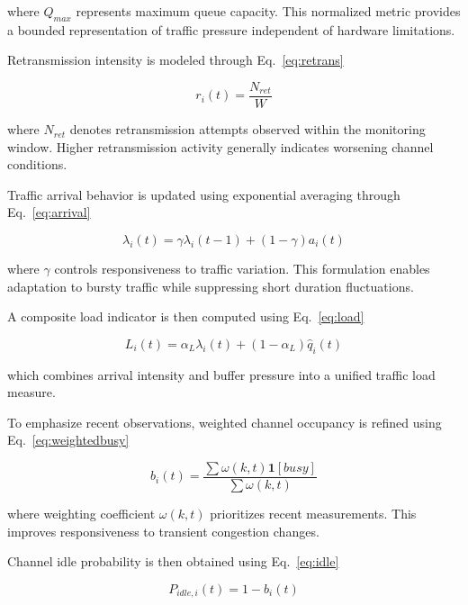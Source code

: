 \documentclass[a4paper,fleqn,final,1p]{cas-dc}
\numberwithin{equation}{section}
\begin{document}
where $Q_{max}$ represents maximum queue capacity. This normalized metric provides a bounded representation of traffic pressure independent of hardware limitations.

Retransmission intensity is modeled through Eq.~\ref{eq:retrans}

\begin{equation}
r_i(t)=
\frac{
N_{ret}
}{W}
\label{eq:retrans}
\end{equation}

where $N_{ret}$ denotes retransmission attempts observed within the monitoring window. Higher retransmission activity generally indicates worsening channel conditions.

Traffic arrival behavior is updated using exponential averaging through Eq.~\ref{eq:arrival}

\begin{equation}
\lambda_i(t)=
\gamma \lambda_i(t-1)
+
(1-\gamma)a_i(t)
\label{eq:arrival}
\end{equation}

where $\gamma$ controls responsiveness to traffic variation. This formulation enables adaptation to bursty traffic while suppressing short duration fluctuations.

A composite load indicator is then computed using Eq.~\ref{eq:load}

\begin{equation}
L_i(t)=
\alpha_L\lambda_i(t)
+
(1-\alpha_L)\hat q_i(t)
\label{eq:load}
\end{equation}

which combines arrival intensity and buffer pressure into a unified traffic load measure.

To emphasize recent observations, weighted channel occupancy is refined using Eq.~\ref{eq:weightedbusy}

\begin{equation}
b_i(t)=
\frac{
\sum \omega(k,t)\mathbf1[busy]
}{
\sum \omega(k,t)
}
\label{eq:weightedbusy}
\end{equation}

where weighting coefficient $\omega(k,t)$ prioritizes recent measurements. This improves responsiveness to transient congestion changes.

Channel idle probability is then obtained using Eq.~\ref{eq:idle}

\begin{equation}
P_{idle,i}(t)=1-b_i(t)
\label{eq:idle}
\end{equation}
\end{document}
